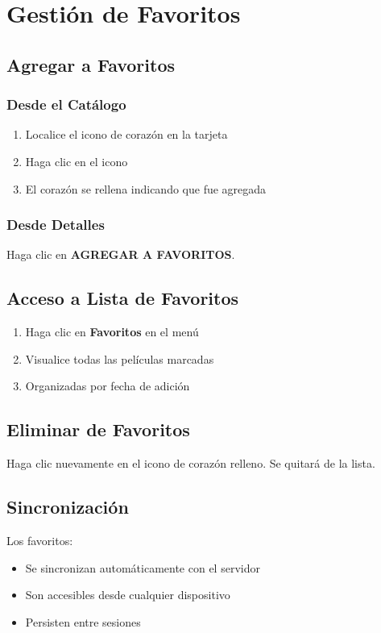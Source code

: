 \documentclass[11pt,a4paper,twoside]{book}
\begin{document}
\chapter{Gestión de Favoritos}

\section{Agregar a Favoritos}

\subsection{Desde el Catálogo}
\begin{enumerate}
    \item Localice el icono de corazón en la tarjeta
    \item Haga clic en el icono
    \item El corazón se rellena indicando que fue agregada
\end{enumerate}

\subsection{Desde Detalles}
Haga clic en \textbf{AGREGAR A FAVORITOS}.

\section{Acceso a Lista de Favoritos}

\begin{enumerate}
    \item Haga clic en \textbf{Favoritos} en el menú
    \item Visualice todas las películas marcadas
    \item Organizadas por fecha de adición
\end{enumerate}

\section{Eliminar de Favoritos}

Haga clic nuevamente en el icono de corazón relleno. Se quitará de la lista.

\section{Sincronización}

Los favoritos:
\begin{itemize}
    \item Se sincronizan automáticamente con el servidor
    \item Son accesibles desde cualquier dispositivo
    \item Persisten entre sesiones
\end{itemize}
\end{document}
